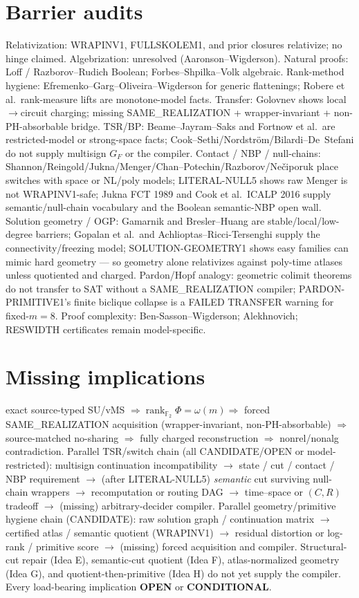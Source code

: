 \documentclass[11pt]{article}
\begin{document}
\section*{Barrier audits}
Relativization: WRAPINV1, FULLSKOLEM1, and prior closures relativize; no hinge claimed.
Algebrization: unresolved (Aaronson--Wigderson).
Natural proofs: Loff / Razborov--Rudich Boolean; Forbes--Shpilka--Volk algebraic.
Rank-method hygiene: Efremenko--Garg--Oliveira--Wigderson for generic flattenings;
Robere et al.\ rank-measure lifts are monotone-model facts.
Transfer: Golovnev shows local$\to$circuit charging; missing SAME\_REALIZATION + wrapper-invariant
+ non-PH-absorbable bridge.
TSR/BP: Beame--Jayram--Saks and Fortnow et al.\ are restricted-model or strong-space facts;
Cook--Sethi/Nordstr\"om/Bilardi--De~Stefani do not supply multisign $G_F$ or the compiler.
Contact / NBP / null-chains: Shannon/Reingold/Jukna/Menger/Chan--Potechin/Razborov/Ne\v{c}iporuk
place switches with space or NL/poly models; LITERAL-NULL5 shows raw Menger is not WRAPINV1-safe;
Jukna FCT 1989 and Cook et al.\ ICALP 2016 supply semantic/null-chain vocabulary and the
Boolean semantic-NBP open wall.
Solution geometry / OGP: Gamarnik and Bresler--Huang are stable/local/low-degree barriers;
Gopalan et al.\ and Achlioptas--Ricci-Tersenghi supply the connectivity/freezing model;
SOLUTION-GEOMETRY1 shows easy families can mimic hard geometry --- so geometry alone
relativizes against poly-time atlases unless quotiented and charged.
Pardon/Hopf analogy: geometric colimit theorems do not transfer to SAT without a
SAME\_REALIZATION compiler; PARDON-PRIMITIVE1's finite biclique collapse is a
FAILED TRANSFER warning for fixed-$m=8$.
Proof complexity: Ben-Sasson--Wigderson; Alekhnovich; RESWIDTH certificates remain model-specific.

\section*{Missing implications}
exact source-typed SU/vMS $\Rightarrow\operatorname{rank}_{\mathbb F_2}\Phi=\omega(m)
\Rightarrow$ forced SAME\_REALIZATION acquisition (wrapper-invariant, non-PH-absorbable)
$\Rightarrow$ source-matched no-sharing $\Rightarrow$ fully charged reconstruction
$\Rightarrow$ nonrel/nonalg contradiction.
Parallel TSR/switch chain (all CANDIDATE/OPEN or model-restricted):
multisign continuation incompatibility $\to$ state / cut / contact / NBP requirement
$\to$ (after LITERAL-NULL5) \emph{semantic} cut surviving null-chain wrappers
$\to$ recomputation or routing DAG $\to$ time--space or $(C,R)$ tradeoff
$\to$ (missing) arbitrary-decider compiler.
Parallel geometry/primitive hygiene chain (CANDIDATE):
raw solution graph / continuation matrix
$\to$ certified atlas / semantic quotient (WRAPINV1)
$\to$ residual distortion or log-rank / primitive score
$\to$ (missing) forced acquisition and compiler.
Structural-cut repair (Idea E), semantic-cut quotient (Idea F), atlas-normalized geometry
(Idea G), and quotient-then-primitive (Idea H) do not yet supply the compiler.
Every load-bearing implication \textbf{OPEN} or \textbf{CONDITIONAL}.
\end{document}
